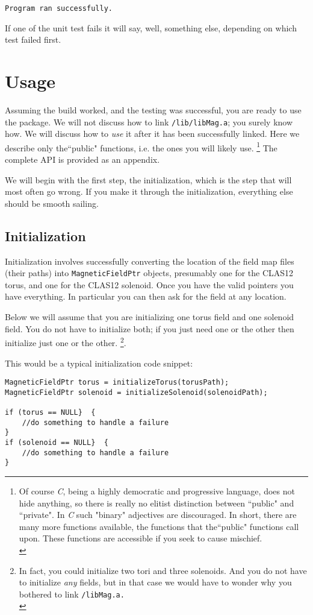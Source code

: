 \documentclass{article}
\begin{document}
\texttt{Program ran successfully. }

If one of the unit test fails it will say, well, something else, depending on which test failed first.
\section {Usage}
Assuming the build worked, and the testing was successful, you are ready to use the package. We will not discuss how to link \texttt{/lib/libMag.a}; you surely know how. We will discuss how to \textit{use} it after it has been successfully  linked. Here we describe only the``public" functions, i.e. the ones you will likely use. \footnote{Of course \textit{C}, being a highly democratic and progressive language, does not hide anything, so there is really no elitist distinction between ``public" and ``private".  In \textit{C} such "binary" adjectives are discouraged.  In short, there are many more functions available, the functions that the``public" functions call upon. These functions  are accessible if you seek to cause mischief.\\} The complete API is provided as an appendix.

We will begin with the first step, the initialization, which is the step that will most often go wrong. If you make it through the initialization, everything else should be smooth sailing.
\subsection{Initialization}

Initialization involves successfully converting the location of the field map files (their paths) into  \texttt{MagneticFieldPtr} objects, presumably one for the CLAS12 torus, and one for the CLAS12 solenoid. Once you have the valid pointers you have everything. In particular you can then ask for the field at any location.

Below we will assume that you are initializing one torus field and one solenoid field. You do not have to initialize both; if you just need one or the other then initialize just one or the other. \footnote{In fact, you could initialize two tori and three solenoids. And you do not have to initialize \textit{any} fields, but in that case we would have to wonder why you bothered to link \texttt{/libMag.a.\\}}. 

This would be a typical initialization code snippet:

\begin{verbatim} 
MagneticFieldPtr torus = initializeTorus(torusPath);
MagneticFieldPtr solenoid = initializeSolenoid(solenoidPath);

if (torus == NULL}  {
    //do something to handle a failure
}
if (solenoid == NULL}  {
    //do something to handle a failure
}

\end{verbatim}
\end{document}
